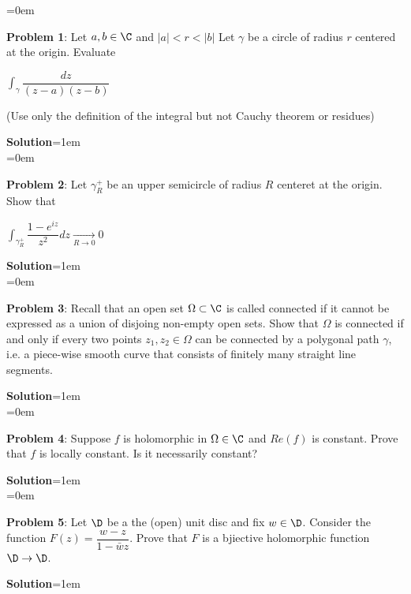 \documentclass{article}
\begin{document}
\newpage\parskip=0em
\begin{mdframed}[backgroundcolor=blue!20]
\textbf{Problem 1}: Let $a, b \in \C$ and $|a| < r < |b|$ Let $\gamma$ be a circle of radius $r$ centered at the origin. Evaluate
\begin{center}
    $\int_{\gamma} \dfrac{dz}{(z-a)(z-b)}$
\end{center}
(Use only the definition of the integral but not Cauchy theorem or residues)
\end{mdframed}
\textbf{Solution}\parskip=1em\\

\newpage\parskip=0em
\begin{mdframed}[backgroundcolor=blue!20]
\textbf{Problem 2}: Let $\gamma_R^+$ be an upper semicircle of radius $R$ centeret at the origin. Show that 
\begin{center}
    $\int_{\gamma_R^+}\dfrac{1-e^{iz}}{z^2}dz \underset{R\rightarrow 0}{\rightarrow} 0  $
\end{center}
\end{mdframed}
\textbf{Solution}\parskip=1em\\

\newpage\parskip=0em
\begin{mdframed}[backgroundcolor=blue!20]
\textbf{Problem 3}: Recall that an open set $\Omega \subset \C$ is called connected if it cannot be expressed as a union of disjoing non-empty open sets. Show that $\Omega$ is connected if and only if every two points $z_1, z_2 \in \Omega$ can be connected by a polygonal path $\gamma$, i.e. a piece-wise smooth curve that consists of finitely many straight line segments.
\end{mdframed}
\textbf{Solution}\parskip=1em\\

\newpage\parskip=0em
\begin{mdframed}[backgroundcolor=blue!20]
\textbf{Problem 4}: Suppose $f$ is holomorphic in $\Omega \in \C$ and $Re(f)$ is constant. Prove that $f$ is locally constant. Is it necessarily constant?
\end{mdframed}
\textbf{Solution}\parskip=1em\\

\newpage\parskip=0em
\begin{mdframed}[backgroundcolor=blue!20]
\textbf{Problem 5}: Let $\D$ be a the (open) unit disc and fix $w \in \D$. Consider the function $F(z) = \dfrac{w-z}{1-\bar{w}z}$. Prove that $F$ is a bjiective holomorphic function $\D \to \D$. 
\end{mdframed}
\textbf{Solution}\parskip=1em\\
\end{document}
